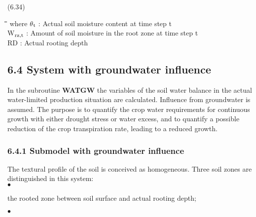 \documentclass[11pt]{article}
\begin{document}
 \bigskip
\strut\hfill (6.34)\\
\strut\hfill 
\nwln
\begin{tabbing}
\hspace{1.27cm}\=\hspace{1.27cm}\=\hspace{1.27cm}\=\hspace{1.27cm}\=%
\hspace{1.27cm}\=\hspace{1.27cm}\=\hspace{1.27cm}\=\hspace{1.27cm}\=%
\hspace{1.27cm}\=\hspace{1.27cm}\=\kill
where\> $\theta$$_{{\rm t}}$\> : Actual soil moisture content at time step t\> \> \> \> \> \> \> \> [cm$^{{\rm 3}}$ cm$^{{\rm -3}}$]\\
\>W$_{{\rm rz,t}}$\> : Amount of soil moisture in the root zone at time step t\> \> \> \> \> \> \> \> [cm]\\
\>RD\> : Actual rooting depth\> \> \> \> \> \> \> \> [cm]
\end{tabbing}

\bigskip
\bigskip

\bigskip

\newpage
\subsection{  6.4 System with groundwater influence  }

In the subroutine {\bf WATGW} the variables of the soil water balance in the actual water-limited produc\-tion situation are calculated. Influence from groundwater is assumed. The
purpose is to quantify the crop water requirements for continuous growth with either
drought stress or water excess, and to quantify a possible reduction of the crop transpira\-tion rate, leading to a reduced growth.

\bigskip
\bigskip

\subsubsection{  6.4.1 Submodel with groundwater influence  }

The textural profile of the soil is conceived as homogeneous. Three soil zones are
distinguished in this system:\\
$\bullet$
\testlastline

\begin{indenting}{1.27cm}
the rooted zone between soil surface and actual rooting depth;
\end{indenting}
$\bullet$
\testlastline
\end{document}
